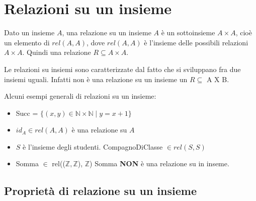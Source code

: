 \newpage
\section{Relazioni su un insieme}
\begin{definition}
Dato un insieme $A$, una relazione su un insieme $A$ è un sottoinsieme $A \times A$, cioè un elemento di $rel(A,A)$, dove $rel(A,A)$ è l'insieme delle possibili relazioni $A \times A$. Quindi una relazione $R \subseteq A \times A$.
\end{definition}
Le relazioni su insiemi sono caratterizzate dal fatto che si sviluppano fra due insiemi uguali. Infatti non è una relazione su un insieme un $R \subseteq$ A X B.
\begin{example}
Alcuni esempi generali di relazioni su un insieme:
\begin{itemize}
    \item Succ = $\{(x,y) \in \mathbb{N} \times \mathbb{N} \mid y=x+1\}$
    \item $id_A \in rel(A,A)$ è una relazione su $A$
    \item $S$ è l'insieme degli studenti. CompagnoDiClasse $\in rel(S,S)$
    \item Somma $\in$ rel(($\mathbb{Z}, \mathbb{Z}$), $\mathbb{Z}$) Somma \textbf{NON} è una relazione su in inseme.
\end{itemize}
\end{example}

\subsection{Proprietà di relazione su un insieme}
